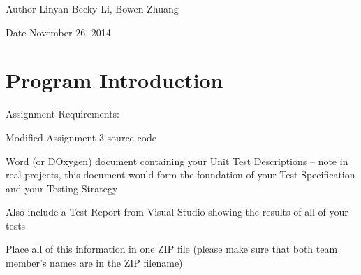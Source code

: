 \begin{DoxyAuthor}{Author}
Linyan Becky Li, Bowen Zhuang 
\end{DoxyAuthor}
\begin{DoxyDate}{Date}
November 26, 2014 
\end{DoxyDate}
\hypertarget{index_intro}{}\section{Program Introduction}\label{index_intro}
Assignment Requirements\+: ~\newline

\begin{DoxyItemize}
\item Modified Assignment-\/3 source code ~\newline

\item Word (or D\+Oxygen) document containing your Unit Test Descriptions – note in real projects, this document would form the foundation of your Test Specification and your Testing Strategy ~\newline

\item Also include a Test Report from Visual Studio showing the results of all of your tests ~\newline

\item Place all of this information in one Z\+I\+P file (please make sure that both team member’s names are in the Z\+I\+P filename) ~\newline
 
\end{DoxyItemize}